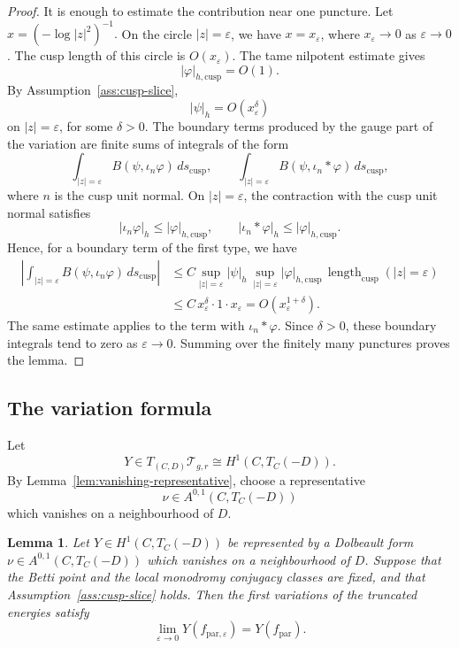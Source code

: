 \documentclass[11pt,reqno]{amsart}
\numberwithin{equation}{section}
\theoremstyle{plain}
\newtheorem{lemma}[theorem]{Lemma}
\theoremstyle{definition}
\theoremstyle{remark}
\begin{document}
\begin{proof}
It is enough to estimate the contribution near one puncture. Let
\(
        x=(-\log |z|^2)^{-1}.
\)
On the circle \(|z|=\varepsilon\), we have \(x=x_\varepsilon\), where
\(x_\varepsilon\to0\) as \(\varepsilon\to0\). The cusp length of this circle is
\(
        O(x_\varepsilon).
\)
The tame nilpotent estimate gives
\[
        |\varphi|_{h,\mathrm{cusp}}=O(1).
\]
By Assumption~\ref{ass:cusp-slice},
\[
        |\psi|_h=O(x_\varepsilon^\delta)
\]
on \(|z|=\varepsilon\), for some \(\delta>0\). The boundary terms produced by the gauge part of the variation are finite sums
of integrals of the form
\[
        \int_{|z|=\varepsilon}
        B(\psi,\iota_n\varphi)\,ds_{\mathrm{cusp}},
        \qquad
        \int_{|z|=\varepsilon}
        B(\psi,\iota_n *\varphi)\,ds_{\mathrm{cusp}},
\]
where \(n\) is the cusp unit normal. On \(|z|=\varepsilon\), the contraction with the cusp unit normal satisfies
\[
        |\iota_n\varphi|_{h}\leq |\varphi|_{h,\mathrm{cusp}},
        \qquad
        |\iota_n *\varphi|_{h}\leq |\varphi|_{h,\mathrm{cusp}}.
\]
Hence, for a boundary term of the first type, we have
\[
\begin{aligned}
\left|
        \int_{|z|=\varepsilon}
        B(\psi,\iota_n\varphi)\,ds_{\mathrm{cusp}}
\right|
&\leq
C
\sup_{|z|=\varepsilon}|\psi|_h\,
\sup_{|z|=\varepsilon}|\varphi|_{h,\mathrm{cusp}}\,
\operatorname{length}_{\mathrm{cusp}}(|z|=\varepsilon)  \\
&\leq
C\,x_\varepsilon^\delta\cdot 1\cdot x_\varepsilon
=
O(x_\varepsilon^{1+\delta}).
\end{aligned}
\]
The same estimate applies to the term with \(\iota_n *\varphi\). Since
\(\delta>0\), these boundary integrals tend to zero as \(\varepsilon\to0\). Summing over the finitely many punctures proves the lemma.
\end{proof}

\subsection{The variation formula}

Let
\[
        Y\in T_{(C,D)}\mathcal T_{g,r}
        \cong
        H^1(C,T_C(-D)).
\]
By Lemma~\ref{lem:vanishing-representative}, choose a representative
\[
        \nu\in A^{0,1}(C,T_C(-D))
\]
which vanishes on a neighbourhood of \(D\).


\begin{lemma}
\label{lem:first-variation-limit}
Let
\(
        Y\in H^1(C,T_C(-D))
\)
be represented by a Dolbeault form
\(
        \nu\in A^{0,1}(C,T_C(-D))
\)
which vanishes on a neighbourhood of \(D\).  Suppose that the Betti point and
the local monodromy conjugacy classes are fixed, and that
Assumption~\ref{ass:cusp-slice} holds.  Then the first variations of the
truncated energies satisfy
\[
        \lim_{\varepsilon\to0}Y(f_{\mathrm{par},\varepsilon})
        =
        Y(f_{\mathrm{par}}).
\]
\end{lemma}
\end{document}
